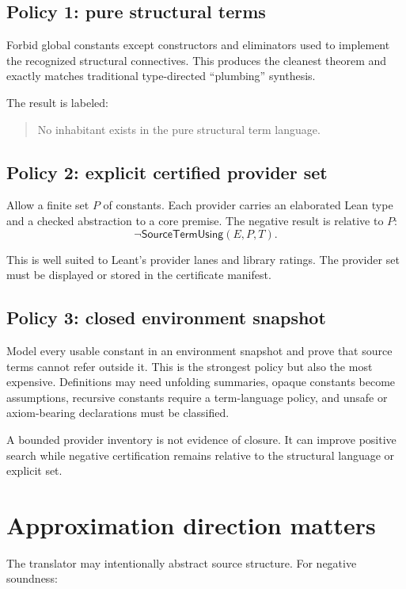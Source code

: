 \documentclass[11pt,letterpaper,openany]{report}
\theoremstyle{definition}
\theoremstyle{remark}
\begin{document}
\subsection{Policy 1: pure structural terms}

Forbid global constants except constructors and eliminators used to implement the recognized structural connectives. This produces the cleanest theorem and exactly matches traditional type-directed ``plumbing'' synthesis.

The result is labeled:
\begin{quote}
No inhabitant exists in the pure structural term language.
\end{quote}

\subsection{Policy 2: explicit certified provider set}

Allow a finite set \(P\) of constants. Each provider carries an elaborated Lean type and a checked abstraction to a core premise. The negative result is relative to \(P\):
\[
  \neg\mathsf{SourceTermUsing}(E,P,T).
\]

This is well suited to Leant's provider lanes and library ratings. The provider set must be displayed or stored in the certificate manifest.

\subsection{Policy 3: closed environment snapshot}

Model every usable constant in an environment snapshot and prove that source terms cannot refer outside it. This is the strongest policy but also the most expensive. Definitions may need unfolding summaries, opaque constants become assumptions, recursive constants require a term-language policy, and unsafe or axiom-bearing declarations must be classified.

A bounded provider inventory is not evidence of closure. It can improve positive search while negative certification remains relative to the structural language or explicit set.

\section{Approximation direction matters}

The translator may intentionally abstract source structure. For negative soundness:
\end{document}
